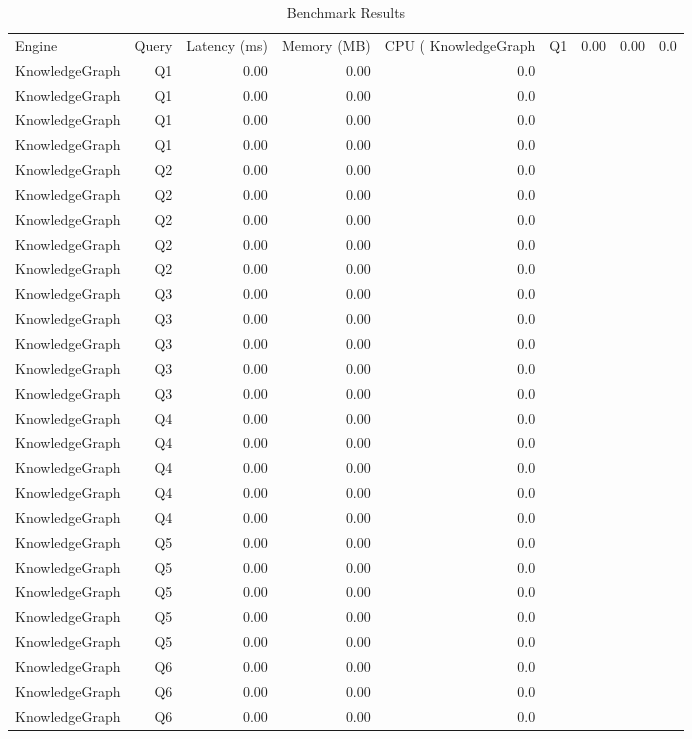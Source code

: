 \begin{table}[htbp]
\centering
\caption{Benchmark Results}
\label{tab:micro-100}
\begin{tabular}{lrrrr}
\toprule
Engine & Query & Latency (ms) & Memory (MB) & CPU (%
\midrule
KnowledgeGraph & Q1 & 0.00 & 0.00 & 0.0 \\
KnowledgeGraph & Q1 & 0.00 & 0.00 & 0.0 \\
KnowledgeGraph & Q1 & 0.00 & 0.00 & 0.0 \\
KnowledgeGraph & Q1 & 0.00 & 0.00 & 0.0 \\
KnowledgeGraph & Q1 & 0.00 & 0.00 & 0.0 \\
KnowledgeGraph & Q2 & 0.00 & 0.00 & 0.0 \\
KnowledgeGraph & Q2 & 0.00 & 0.00 & 0.0 \\
KnowledgeGraph & Q2 & 0.00 & 0.00 & 0.0 \\
KnowledgeGraph & Q2 & 0.00 & 0.00 & 0.0 \\
KnowledgeGraph & Q2 & 0.00 & 0.00 & 0.0 \\
KnowledgeGraph & Q3 & 0.00 & 0.00 & 0.0 \\
KnowledgeGraph & Q3 & 0.00 & 0.00 & 0.0 \\
KnowledgeGraph & Q3 & 0.00 & 0.00 & 0.0 \\
KnowledgeGraph & Q3 & 0.00 & 0.00 & 0.0 \\
KnowledgeGraph & Q3 & 0.00 & 0.00 & 0.0 \\
KnowledgeGraph & Q4 & 0.00 & 0.00 & 0.0 \\
KnowledgeGraph & Q4 & 0.00 & 0.00 & 0.0 \\
KnowledgeGraph & Q4 & 0.00 & 0.00 & 0.0 \\
KnowledgeGraph & Q4 & 0.00 & 0.00 & 0.0 \\
KnowledgeGraph & Q4 & 0.00 & 0.00 & 0.0 \\
KnowledgeGraph & Q5 & 0.00 & 0.00 & 0.0 \\
KnowledgeGraph & Q5 & 0.00 & 0.00 & 0.0 \\
KnowledgeGraph & Q5 & 0.00 & 0.00 & 0.0 \\
KnowledgeGraph & Q5 & 0.00 & 0.00 & 0.0 \\
KnowledgeGraph & Q5 & 0.00 & 0.00 & 0.0 \\
KnowledgeGraph & Q6 & 0.00 & 0.00 & 0.0 \\
KnowledgeGraph & Q6 & 0.00 & 0.00 & 0.0 \\
KnowledgeGraph & Q6 & 0.00 & 0.00 & 0.0 \\

\end{tabular}
\end{table}
